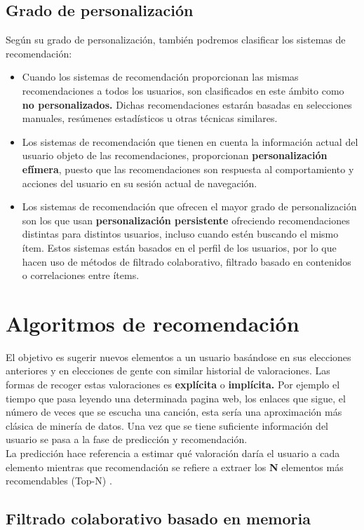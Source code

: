 \documentclass[12pt,letterpaper,oneside] {memoir}
\begin{document}
\subsection{Grado de personalización}
Según su grado de personalización, también podremos clasificar los sistemas de recomendación:
\begin{itemize}
\item Cuando los sistemas de recomendación proporcionan las mismas recomendaciones a todos los usuarios, son clasificados en este ámbito como \textbf{no personalizados.} Dichas recomendaciones estarán basadas en selecciones manuales, resúmenes estadísticos u otras técnicas similares.
\item Los sistemas de recomendación que tienen en cuenta la información actual del usuario objeto de las recomendaciones, proporcionan \textbf{personalización efímera}, puesto que las recomendaciones son respuesta al comportamiento y acciones del usuario en su sesión actual de navegación.
\item Los sistemas de recomendación que ofrecen el mayor grado de personalización son los que usan \textbf{personalización persistente} ofreciendo recomendaciones distintas para distintos usuarios, incluso cuando estén buscando el mismo ítem. Estos sistemas están basados en el perfil de los usuarios, por lo que hacen uso de métodos de filtrado colaborativo, filtrado basado en contenidos o correlaciones entre ítems.
\end{itemize}

\section{Algoritmos de recomendación}
El objetivo es sugerir nuevos elementos a un usuario basándose en sus elecciones anteriores y en elecciones de gente con similar historial de valoraciones. Las formas de recoger estas valoraciones es \textbf{explícita} o \textbf{implícita.} Por ejemplo el tiempo que pasa leyendo una determinada pagina web, los enlaces que sigue, el número de veces que se escucha una canción, esta sería una aproximación más clásica de minería de datos. Una vez que se tiene suficiente información del usuario se pasa a la fase de predicción y recomendación. \\
La predicción hace referencia a estimar qué valoración daría el usuario a cada elemento mientras que recomendación se refiere a extraer los \textbf{N} elementos más recomendables (Top-N) \citep{GalanNieto1994}.

\subsection{Filtrado colaborativo basado en memoria}
\end{document}
